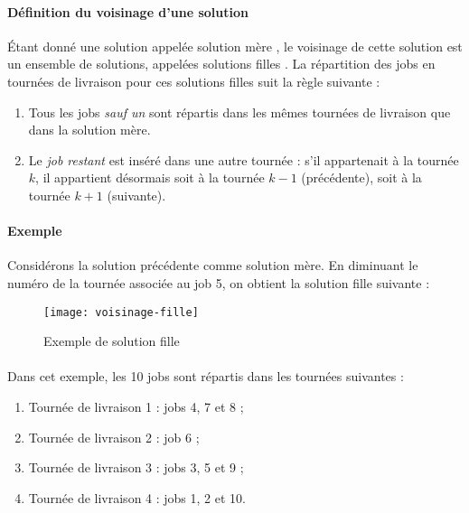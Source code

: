 \paragraph{Définition du voisinage d'une solution\\}
Étant donné une solution appelée \og solution mère \fg{}, le voisinage de cette solution est un ensemble de solutions,
appelées \og solutions filles \fg{}. La répartition des jobs en tournées de livraison pour ces solutions filles suit la règle suivante :
\begin{enumerate}
\item Tous les jobs \textit{sauf un} sont répartis dans les mêmes tournées de livraison que dans la solution mère.
\item Le \textit{job restant} est inséré dans une autre tournée : s'il appartenait à la tournée $ k $,
il appartient désormais soit à la tournée $ k - 1 $ (précédente), soit à la tournée $ k + 1 $ (suivante).
\end{enumerate}

\paragraph{Exemple\\}
Considérons la solution précédente comme solution mère. En diminuant le numéro de la tournée associée au job 5,
on obtient la solution fille suivante :

\begin{figure}[H] %
\centering
\texttt{[image: voisinage-fille]}
\caption{\label{fig:voisinage-fille}Exemple de solution fille}
\end{figure}

\paragraph{}
Dans cet exemple, les 10 jobs sont répartis dans les tournées suivantes :
\begin{enumerate}
\item Tournée de livraison 1 : jobs 4, 7 et 8 ;
\item Tournée de livraison 2 : job 6 ;
\item Tournée de livraison 3 : jobs 3, 5 et 9 ;
\item Tournée de livraison 4 : jobs 1, 2 et 10.
\end{enumerate}


